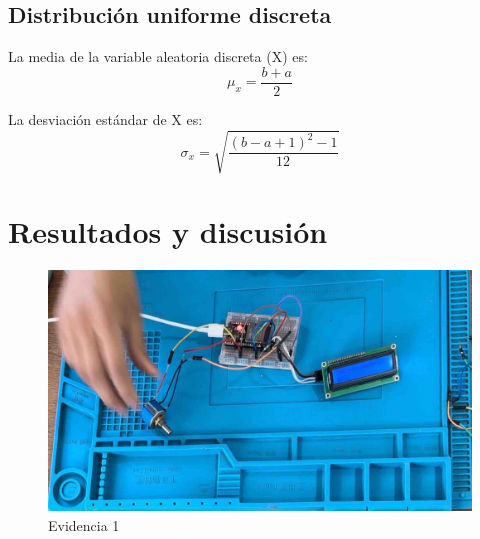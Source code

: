     
    \subsection{Distribución uniforme discreta}
    La media de la variable aleatoria discreta (X) es:
    \begin{equation}
         \mu_x=\dfrac{b+a}{2}
    \end{equation}
    
    La desviación estándar de X es:
    \begin{equation}
         \sigma_x=\sqrt{\dfrac{(b-a+1)^2-1}{12}}
    \end{equation}
    
    
    \section{Resultados y discusión}
    
    \begin{figure}[H]
        \centering
        \includegraphics[trim = {0mm 0mm 0mm 0mm},clip,scale=0.2]{8/Img/Evidencia 1.pdf}
        \caption{Evidencia 1}
        \label{Evidencia 1}
    \end{figure}
    

